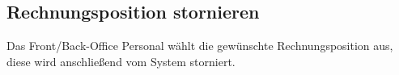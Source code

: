 \documentclass[../SubfileFeatures.tex]{subfiles}
\begin{document}
    \subsection{Rechnungsposition stornieren}
    Das Front/Back-Office Personal wählt die gewünschte Rechnungsposition aus, diese wird anschließend vom System storniert.
\end{document}
